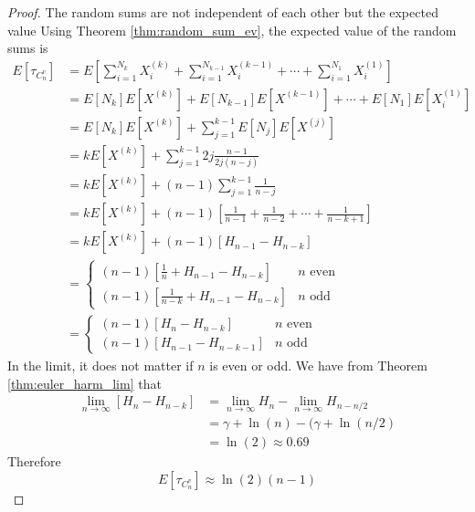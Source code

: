 \begin{proof}
The random sums are not independent of each other but the expected value
Using Theorem \ref{thm:random_sum_ev}, the expected value of the random sums is
\begin{align*}
    E[\tau_{C_n^{v}}] &= E\left[\sum_{i = 1}^{N_k} X_i^{(k)} + \sum_{i = 1}^{N_{k - 1}} X_i^{(k - 1)} + \cdots + \sum_{i = 1}^{N_1} X_i^{(1)}\right]\\
    &= E[N_k] E[X^{(k)}] + E[N_{k - 1}] E[X^{(k - 1)}] + \cdots + E[N_1]E[X_i^{(1)}]\\
    &= E[N_k] E[X^{(k)}] + \sum_{j = 1}^{k - 1} E[N_j]E[X^{(j)}]\\
    &= k E[X^{(k)}] + \sum_{j = 1}^{k - 1} 2j \frac{n - 1}{2j (n - j)} \\
    &= k E[X^{(k)}] + (n - 1) \sum_{j = 1}^{k - 1} \frac{1}{n - j}\\
    &= k E[X^{(k)}] + (n - 1) \left[ \frac{1}{n - 1} + \frac{1}{n - 2} + \cdots + \frac{1}{n - k + 1} \right]\\
    &= k E[X^{(k)}] + (n - 1) \left[ H_{n - 1} - H_{n - k} \right]\\
    &= \begin{cases}
    (n - 1) \left[\frac{1}{n} + H_{n - 1} - H_{n - k}\right] & n \text{ even}\\
    (n - 1) \left[\frac{1}{n - k} + H_{n - 1} - H_{n - k}\right] & n \text{ odd}
    \end{cases}\\
    &= \begin{cases}
    (n - 1) \left[H_{n} - H_{n - k}\right] & n \text{ even}\\
    (n - 1) \left[H_{n - 1} - H_{n - k - 1}\right] & n \text{ odd}
\end{cases}
\end{align*}
In the limit, it does not matter if $n$ is even or odd.
We have from Theorem \ref{thm:euler_harm_lim} that
\begin{align*}
    \lim_{n \to \infty} [H_{n} - H_{n - k}] &=  \lim_{n \to \infty} H_{n} - \lim_{n \to \infty}  H_{n - n/2}\\
    &= \gamma + \ln(n) - (\gamma + \ln(n/2)\\
    &= \ln(2) \approx 0.69
\end{align*}
Therefore
$$
E[\tau_{C_n^{v}}] \approx \ln(2) (n - 1)
$$
\end{proof}


